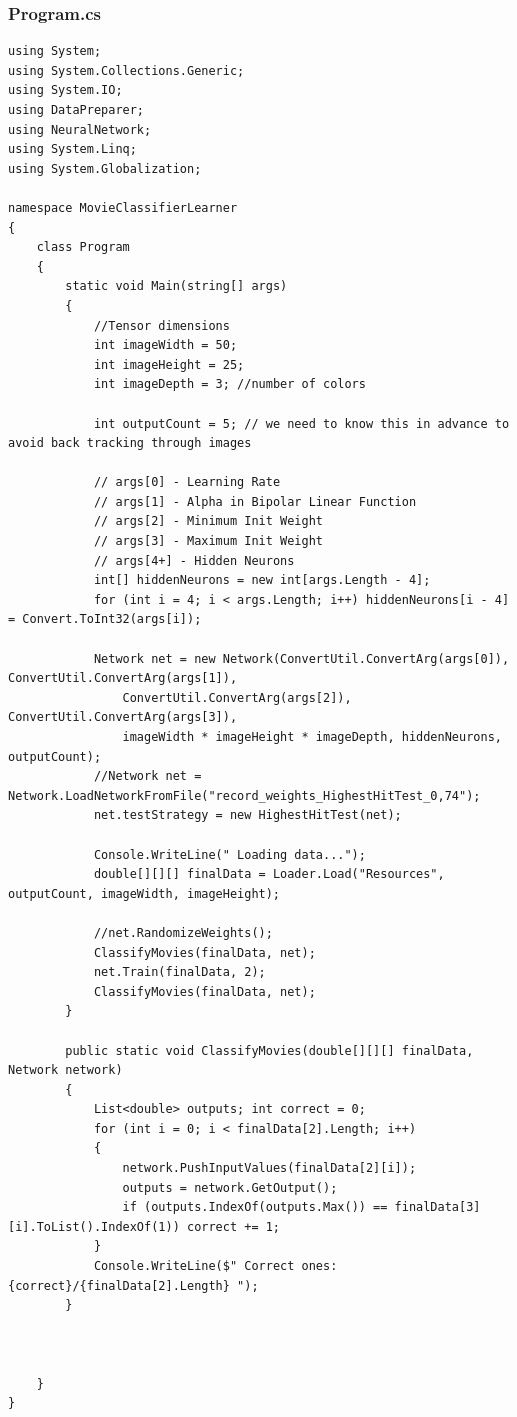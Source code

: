 \documentclass[12pt,a4paper]{article}
\begin{document}
\subsubsection*{Program.cs}
\begin{lstlisting}
using System;
using System.Collections.Generic;
using System.IO;
using DataPreparer;
using NeuralNetwork;
using System.Linq;
using System.Globalization;

namespace MovieClassifierLearner
{
    class Program
    {
        static void Main(string[] args)
        {
            //Tensor dimensions
            int imageWidth = 50;
            int imageHeight = 25;
            int imageDepth = 3; //number of colors

            int outputCount = 5; // we need to know this in advance to avoid back tracking through images

            // args[0] - Learning Rate
            // args[1] - Alpha in Bipolar Linear Function
            // args[2] - Minimum Init Weight
            // args[3] - Maximum Init Weight
            // args[4+] - Hidden Neurons
            int[] hiddenNeurons = new int[args.Length - 4];
            for (int i = 4; i < args.Length; i++) hiddenNeurons[i - 4] = Convert.ToInt32(args[i]);

            Network net = new Network(ConvertUtil.ConvertArg(args[0]), ConvertUtil.ConvertArg(args[1]), 
                ConvertUtil.ConvertArg(args[2]), ConvertUtil.ConvertArg(args[3]), 
                imageWidth * imageHeight * imageDepth, hiddenNeurons, outputCount);
            //Network net = Network.LoadNetworkFromFile("record_weights_HighestHitTest_0,74");
            net.testStrategy = new HighestHitTest(net);

            Console.WriteLine(" Loading data...");
            double[][][] finalData = Loader.Load("Resources", outputCount, imageWidth, imageHeight);

            //net.RandomizeWeights();
            ClassifyMovies(finalData, net);
            net.Train(finalData, 2);
            ClassifyMovies(finalData, net);
        }

        public static void ClassifyMovies(double[][][] finalData, Network network)
        {
            List<double> outputs; int correct = 0;
            for (int i = 0; i < finalData[2].Length; i++)
            {
                network.PushInputValues(finalData[2][i]);
                outputs = network.GetOutput();
                if (outputs.IndexOf(outputs.Max()) == finalData[3][i].ToList().IndexOf(1)) correct += 1;
            }
            Console.WriteLine($" Correct ones: {correct}/{finalData[2].Length} ");
        }



    }
}\end{lstlisting}
\pagebreak
\end{document}
